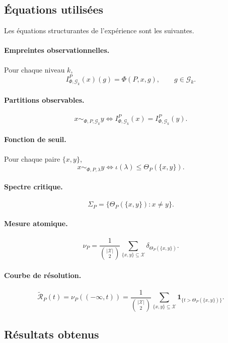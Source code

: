 \documentclass[11pt,a4paper]{article}
\begin{document}
\begin{appendices}
\subsection{Équations utilisées}

Les équations structurantes de l'expérience sont les suivantes.

\paragraph{Empreintes observationnelles.}
Pour chaque niveau \(k\),
\[
I_{\Phi,\mathcal G_k}^P(x)(g)=\Phi(P,x,g),
\qquad g\in\mathcal G_k.
\]

\paragraph{Partitions observables.}
\[
x\sim_{\Phi,P,\mathcal G_k}y
\Longleftrightarrow
I_{\Phi,\mathcal G_k}^P(x)=I_{\Phi,\mathcal G_k}^P(y).
\]

\paragraph{Fonction de seuil.}
Pour chaque paire \(\{x,y\}\),
\[
x\sim_{\Phi,P,\lambda}y
\Longleftrightarrow
\iota(\lambda)\le \Theta_P(\{x,y\}).
\]

\paragraph{Spectre critique.}
\[
\Sigma_P=\{\Theta_P(\{x,y\}) : x\neq y\}.
\]

\paragraph{Mesure atomique.}
\[
\nu_P
=
\frac{1}{\binom{|\mathcal X|}{2}}
\sum_{\{x,y\}\subseteq\mathcal X}\delta_{\Theta_P(\{x,y\})}.
\]

\paragraph{Courbe de résolution.}
\[
\widetilde{\mathcal R}_P(t)
=
\nu_P((-\infty,t))
=
\frac{1}{\binom{|\mathcal X|}{2}}
\sum_{\{x,y\}\subseteq\mathcal X}
\mathbf 1_{\{t>\Theta_P(\{x,y\})\}}.
\]

\subsection{Résultats obtenus}


\end{appendices}
\end{document}
